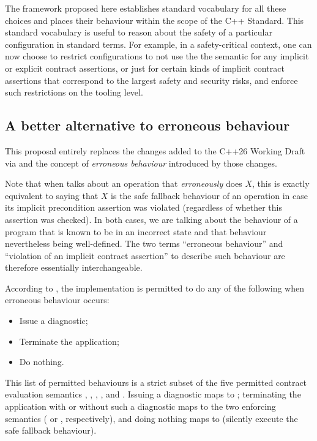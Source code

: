 The framework proposed here establishes standard vocabulary for all these choices and places their behaviour within the scope of the C++ Standard. This standard vocabulary is useful to reason about the safety of a particular configuration in standard terms. For example, in a safety-critical context, one can now choose to restrict configurations to not use the  the semantic for any implicit or explicit contract assertions, or just for certain kinds of implicit contract assertions that correspond to the largest safety and security risks, and enforce such restrictions on the tooling level.

\subsection{A better alternative to erroneous behaviour}
\label{subsec:erroneous}

This proposal entirely replaces the changes added to the C++26 Working Draft via \cite{P2795R5} and the concept of \emph{erroneous behaviour} introduced by those changes.

Note that when \cite{P2795R5} talks about an operation that \emph{erroneously} does $X$, this is exactly equivalent to saying that $X$ is the safe fallback behaviour of an operation in case its implicit precondition assertion was violated (regardless of whether this assertion was checked). In both cases, we are talking about the behaviour of a program that is known to be in an incorrect state and that behaviour nevertheless being well-defined. The two terms ``erroneous behaviour'' and ``violation of an implicit contract assertion'' to describe such behaviour are therefore essentially interchangeable.


According to \cite{P2795R5}, the implementation is permitted to do any of the following when erroneous behaviour occurs:
\begin{itemize}
\item Issue a diagnostic; 
\item Terminate the application; 
\item Do nothing.
\end{itemize}
This list of permitted behaviours is a strict subset of the five permitted contract evaluation semantics , , , , and . Issuing a diagnostic maps to ; terminating the application with or without such a diagnostic maps to the two enforcing semantics ( or , respectively), and doing nothing maps to  (silently execute the safe fallback behaviour).

